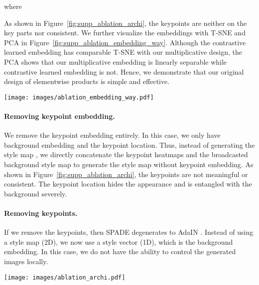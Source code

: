 \documentclass[10pt, conference, compsocconf]{IEEEtran}
\begin{document}
where 

As shown in Figure~\ref{fig:supp_ablation_archi}, the keypoints are neither on the key parts nor consistent. We further visualize the embeddings with T-SNE and PCA in Figure~\ref{fig:supp_ablation_embedding_way}. Although the contrastive learned embedding has comparable T-SNE with our multiplicative design, the PCA shows that our multiplicative embedding is linearly separable while contrastive learned embedding is not. Hence, we demonstrate that our original design of elementwise products is simple and effective.

\begin{figure*}[t]
\begin{center}
   \texttt{[image: images/ablation\_embedding\_way.pdf]}
\end{center}
   \caption{\textbf{Ablation study on multiplicative embedding}. We show the T-SNE and PCA visualization of embeddings learned on FFHQ. The first two column shows keypoint embeddings and the last two column shows keypoint embeddings and background embedding.}
\label{fig:supp_ablation_embedding_way}
\end{figure*}

\paragraph{Removing keypoint embedding.} We remove the keypoint embedding  entirely. In this case, we only have background embedding  and the keypoint location. Thus, instead of generating the style map , we directly concatenate the keypoint heatmaps  and the broadcasted background style map to generate the style map without keypoint embedding. As shown in Figure~\ref{fig:supp_ablation_archi}, the keypoints are not meaningful or consistent. The keypoint location hides the appearance and is entangled with the background severely.

\paragraph{Removing keypoints.} If we remove the keypoints, then SPADE \cite{park2019semantic} degenerates to AdaIN \cite{huang2017arbitrary}. Instead of using a style map  (2D), we now use a style vector (1D), which is the background embedding. In this case, we do not have the ability to control the generated images locally.



\begin{figure*}[t]
\begin{center}
  \texttt{[image: images/ablation\_archi.pdf]}
\end{center}
  \caption{\textbf{Ablation study on architecture}. We show the keypoints for different architectures.}
\label{fig:supp_ablation_archi}
\end{figure*}
\end{document}
